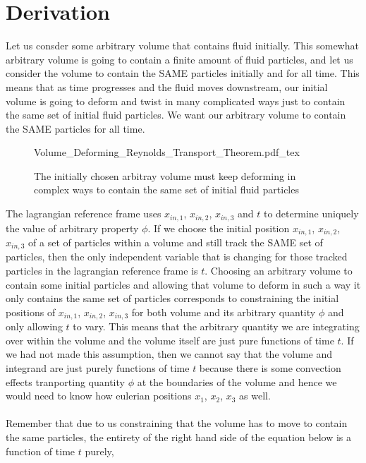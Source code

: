 \section{Derivation}
\begin{comment}
\end{comment}
Let us consder some arbitrary volume that contains fluid initially.
This somewhat arbitrary volume is going to contain a finite amount of fluid particles, and let us consider the volume to contain the SAME particles initially and for all time.
This means that as time progresses and the fluid moves downstream, our initial volume is going to deform and twist in many complicated ways just to contain the same set of initial fluid particles.
We want our arbitrary volume to contain the SAME particles for all time.
\begin{figure}[H]\centering
\def\svgwidth{400px}
{Volume_Deforming_Reynolds_Transport_Theorem.pdf_tex}
\caption{The initially chosen arbitray volume must keep deforming in complex ways to contain the same set of initial fluid particles}
\label{Volume Deforming Reynolds Transport Theorem}
\end{figure}
The lagrangian reference frame uses $x_{in,1}$, $x_{in,2}$, $x_{in,3}$ and $t$ to determine uniquely the value of arbitrary property $\phi$.
If we choose the initial position $x_{in,1}$, $x_{in,2}$, $x_{in,3}$ of a set of particles within a volume and still track the SAME set of particles, then the only independent variable that is changing for those tracked particles in the lagrangian reference frame is $t$.
Choosing an arbitrary volume to contain some initial particles and allowing that volume to deform in such a way it only contains the same set of particles corresponds to constraining the initial positions of $x_{in,1}$, $x_{in,2}$, $x_{in,3}$ for both volume and its arbitrary quantity $\phi$ and only allowing $t$ to vary.
This means that the arbitrary quantity we are integrating over within the volume and the volume itself are just pure functions of time $t$. 
If we had not made this assumption, then we cannot say that the volume and integrand are just purely functions of time $t$ because there is some convection effects tranporting quantity $\phi$ at the boundaries of the volume and hence we would need to know how eulerian positions $x_{1}$, $x_{2}$, $x_{3}$ as well.
\\~\\Remember that due to us constraining that the volume has to move to contain the same particles, the entirety of the right hand side of the equation below is a function of time $t$ purely,

